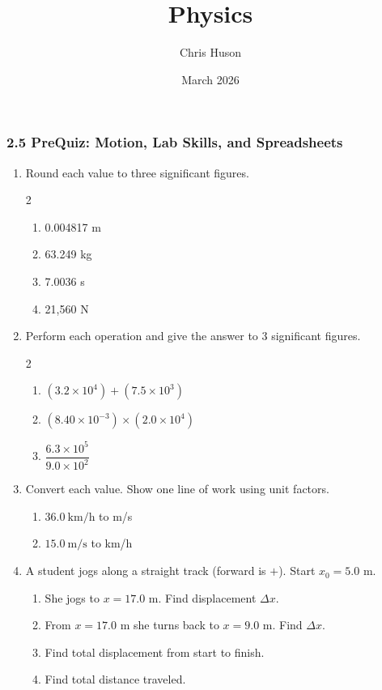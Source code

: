 \documentclass[12pt, twoside]{article}
\title{Physics}
\author{Chris Huson}
\date{March 2026}
\begin{document}
\subsubsection*{2.5 PreQuiz: Motion, Lab Skills, and Spreadsheets}

\begin{enumerate}[itemsep=0.5cm]

\item Round each value to three significant figures.
  \begin{multicols}{2}
  \begin{enumerate}[itemsep=0.5cm]
    \item 0.004817 m
    \item 63.249 kg
    \item 7.0036 s
    \item 21,560 N
  \end{enumerate}
  \end{multicols}
  \vspace{0.5cm}

\item Perform each operation and give the answer to 3 significant figures.
  \begin{multicols}{2}
  \begin{enumerate}[itemsep=1cm]
    \item $(3.2\times10^{4}) + (7.5\times10^{3})$
    \item $(8.40\times10^{-3}) \times (2.0\times10^{4})$
    \item $\dfrac{6.3\times10^{5}}{9.0\times10^{2}}$
  \end{enumerate}
  \end{multicols}
  \vspace{0.5cm}

\item Convert each value. Show one line of work using unit factors.
  \begin{enumerate}[itemsep=1.5cm]
    \item $36.0~\text{km/h}$ to m/s
    \item $15.0~\text{m/s}$ to km/h
  \end{enumerate}
  \vspace{0.5cm}

\item A student jogs along a straight track (forward is $+$). Start $x_0 = 5.0$ m.
  \begin{enumerate}[itemsep=0.5cm]
    \item She jogs to $x = 17.0$ m. Find displacement $\Delta x$.
    \item From $x=17.0$ m she turns back to $x=9.0$ m. Find $\Delta x$.
    \item Find total displacement from start to finish.
    \item Find total distance traveled.
  \end{enumerate}


\end{enumerate}
\end{document}

